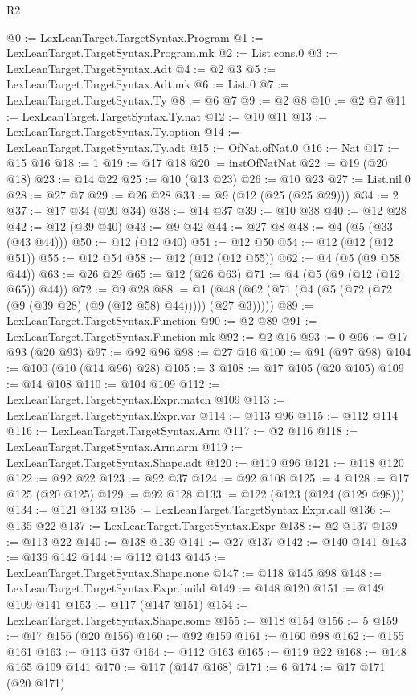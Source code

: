 \begin{lexlean}{R2}
\begin{coremodule}
@0 := LexLeanTarget.TargetSyntax.Program
@1 := LexLeanTarget.TargetSyntax.Program.mk
@2 := List.cons.{0}
@3 := LexLeanTarget.TargetSyntax.Adt
@4 := @2 @3
@5 := LexLeanTarget.TargetSyntax.Adt.mk
@6 := List.{0}
@7 := LexLeanTarget.TargetSyntax.Ty
@8 := @6 @7
@9 := @2 @8
@10 := @2 @7
@11 := LexLeanTarget.TargetSyntax.Ty.nat
@12 := @10 @11
@13 := LexLeanTarget.TargetSyntax.Ty.option
@14 := LexLeanTarget.TargetSyntax.Ty.adt
@15 := OfNat.ofNat.{0}
@16 := Nat
@17 := @15 @16
@18 := 1
@19 := @17 @18
@20 := instOfNatNat
@22 := @19 (@20 @18)
@23 := @14 @22
@25 := @10 (@13 @23)
@26 := @10 @23
@27 := List.nil.{0}
@28 := @27 @7
@29 := @26 @28
@33 := @9 (@12 (@25 (@25 @29)))
@34 := 2
@37 := @17 @34 (@20 @34)
@38 := @14 @37
@39 := @10 @38
@40 := @12 @28
@42 := @12 (@39 @40)
@43 := @9 @42
@44 := @27 @8
@48 := @4 (@5 (@33 (@43 @44)))
@50 := @12 (@12 @40)
@51 := @12 @50
@54 := @12 (@12 (@12 @51))
@55 := @12 @54
@58 := @12 (@12 (@12 @55))
@62 := @4 (@5 (@9 @58 @44))
@63 := @26 @29
@65 := @12 (@26 @63)
@71 := @4 (@5 (@9 (@12 (@12 @65)) @44))
@72 := @9 @28
@88 := @1 (@48 (@62 (@71 (@4 (@5 (@72 (@72 (@9 (@39 @28) (@9 (@12 @58) @44))))) (@27 @3)))))
@89 := LexLeanTarget.TargetSyntax.Function
@90 := @2 @89
@91 := LexLeanTarget.TargetSyntax.Function.mk
@92 := @2 @16
@93 := 0
@96 := @17 @93 (@20 @93)
@97 := @92 @96
@98 := @27 @16
@100 := @91 (@97 @98)
@104 := @100 (@10 (@14 @96) @28)
@105 := 3
@108 := @17 @105 (@20 @105)
@109 := @14 @108
@110 := @104 @109
@112 := LexLeanTarget.TargetSyntax.Expr.match @109
@113 := LexLeanTarget.TargetSyntax.Expr.var
@114 := @113 @96
@115 := @112 @114
@116 := LexLeanTarget.TargetSyntax.Arm
@117 := @2 @116
@118 := LexLeanTarget.TargetSyntax.Arm.arm
@119 := LexLeanTarget.TargetSyntax.Shape.adt
@120 := @119 @96
@121 := @118 @120
@122 := @92 @22
@123 := @92 @37
@124 := @92 @108
@125 := 4
@128 := @17 @125 (@20 @125)
@129 := @92 @128
@133 := @122 (@123 (@124 (@129 @98)))
@134 := @121 @133
@135 := LexLeanTarget.TargetSyntax.Expr.call
@136 := @135 @22
@137 := LexLeanTarget.TargetSyntax.Expr
@138 := @2 @137
@139 := @113 @22
@140 := @138 @139
@141 := @27 @137
@142 := @140 @141
@143 := @136 @142
@144 := @112 @143
@145 := LexLeanTarget.TargetSyntax.Shape.none
@147 := @118 @145 @98
@148 := LexLeanTarget.TargetSyntax.Expr.build
@149 := @148 @120
@151 := @149 @109 @141
@153 := @117 (@147 @151)
@154 := LexLeanTarget.TargetSyntax.Shape.some
@155 := @118 @154
@156 := 5
@159 := @17 @156 (@20 @156)
@160 := @92 @159
@161 := @160 @98
@162 := @155 @161
@163 := @113 @37
@164 := @112 @163
@165 := @119 @22
@168 := @148 @165 @109 @141
@170 := @117 (@147 @168)
@171 := 6
@174 := @17 @171 (@20 @171)

\end{coremodule}
\end{lexlean}
